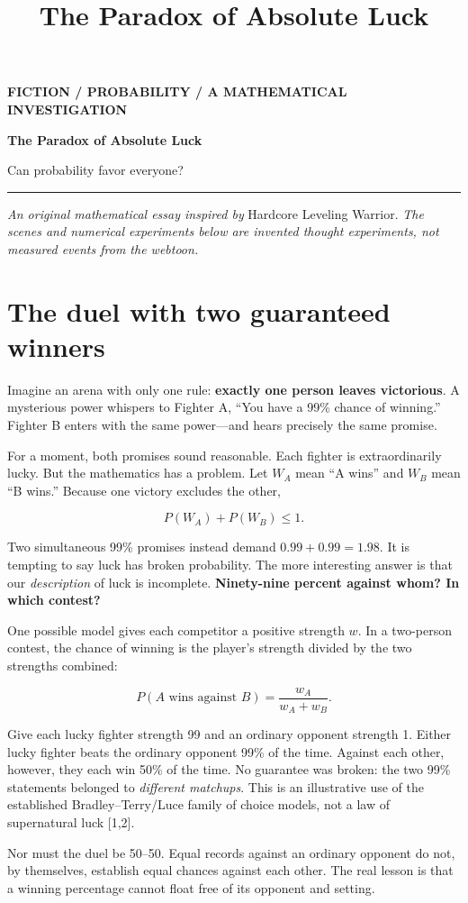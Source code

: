 \documentclass[
  11pt,
]{article}
\title{The Paradox of Absolute Luck}
\author{}
\date{}
\renewcommand{\maketitle}{%
{\sffamily\fontsize{9}{12}\selectfont\bfseries\color{essayteal}FICTION \quad / \quad PROBABILITY \quad / \quad A MATHEMATICAL INVESTIGATION}\par\vspace{11pt}
{\fontsize{29}{33}\selectfont\bfseries\color{essayink}The Paradox of Absolute Luck}\par\vspace{4pt}
{\fontsize{17}{23}\selectfont\color{essayink}Can probability favor everyone?}\par\vspace{12pt}
{\color{essayrule}\rule{\linewidth}{.9pt}}\vspace{5pt}
}
\begin{document}
\maketitle

\emph{An original mathematical essay inspired by} Hardcore Leveling
Warrior. \emph{The scenes and numerical experiments below are invented
thought experiments, not measured events from the webtoon.}

\section{The duel with two guaranteed
winners}\label{the-duel-with-two-guaranteed-winners}

Imagine an arena with only one rule: \textbf{exactly one person leaves
victorious}. A mysterious power whispers to Fighter A, ``You have a 99\%
chance of winning.'' Fighter B enters with the same power---and hears
precisely the same promise.

For a moment, both promises sound reasonable. Each fighter is
extraordinarily lucky. But the mathematics has a problem. Let \(W_A\)
mean ``A wins'' and \(W_B\) mean ``B wins.'' Because one victory
excludes the other,

\[P(W_A)+P(W_B)\leq 1.\]

Two simultaneous 99\% promises instead demand \(0.99+0.99=1.98\). It is
tempting to say luck has broken probability. The more interesting answer
is that our \emph{description} of luck is incomplete.
\textbf{Ninety-nine percent against whom? In which contest?}

One possible model gives each competitor a positive strength \(w\). In a
two-person contest, the chance of winning is the player's strength
divided by the two strengths combined:

\[P(A\text{ wins against }B)=\frac{w_A}{w_A+w_B}.\]

Give each lucky fighter strength 99 and an ordinary opponent strength 1.
Either lucky fighter beats the ordinary opponent 99\% of the time.
Against each other, however, they each win 50\% of the time. No
guarantee was broken: the two 99\% statements belonged to
\emph{different matchups}. This is an illustrative use of the
established Bradley--Terry/Luce family of choice models, not a law of
supernatural luck {[}1,2{]}.

Nor must the duel be 50--50. Equal records against an ordinary opponent
do not, by themselves, establish equal chances against each other. The
real lesson is that a winning percentage cannot float free of its
opponent and setting.
\end{document}
